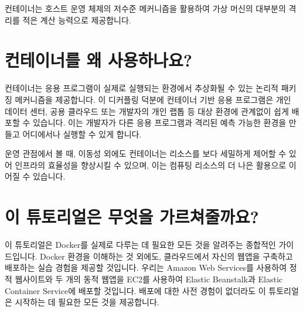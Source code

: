 컨테이너는 호스트 운영 체제의 저수준 메커니즘을 활용하여 가상 머신의 대부분의 격리를 적은 계산 능력으로 제공합니다.

\section{컨테이너를 왜 사용하나요?}
컨테이너는 응용 프로그램이 실제로 실행되는 환경에서 추상화될 수 있는 논리적 패키징 메커니즘을 제공합니다. 이 디커플링 덕분에 컨테이너 기반 응용 프로그램은 개인 데이터 센터, 공용 클라우드 또는 개발자의 개인 랩톱 등 대상 환경에 관계없이 쉽게 배포할 수 있습니다. 이는 개발자가 다른 응용 프로그램과 격리된 예측 가능한 환경을 만들고 어디에서나 실행할 수 있게 합니다.

운영 관점에서 볼 때, 이동성 외에도 컨테이너는 리소스를 보다 세밀하게 제어할 수 있어 인프라의 효율성을 향상시킬 수 있으며, 이는 컴퓨팅 리소스의 더 나은 활용으로 이어질 수 있습니다.

\section{이 튜토리얼은 무엇을 가르쳐줄까요?}
이 튜토리얼은 Docker를 실제로 다루는 데 필요한 모든 것을 알려주는 종합적인 가이드입니다. Docker 환경을 이해하는 것 외에도, 클라우드에서 자신의 웹앱을 구축하고 배포하는 실습 경험을 제공할 것입니다. 우리는 Amazon Web Services를 사용하여 정적 웹사이트와 두 개의 동적 웹앱을 EC2를 사용하여 Elastic Beanstalk과 Elastic Container Service에 배포할 것입니다. 배포에 대한 사전 경험이 없더라도 이 튜토리얼은 시작하는 데 필요한 모든 것을 제공합니다.
